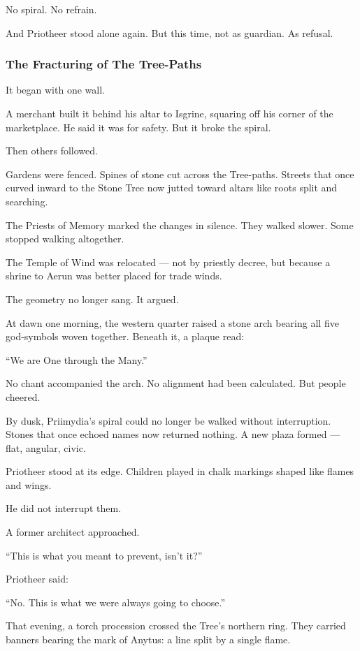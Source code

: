 \documentclass[12pt]{article}
\begin{document}
No spiral.  
No refrain.

And Priotheer stood alone again.  
But this time, not as guardian.  
As refusal.


\dotfill

\subsubsection*{The Fracturing of The Tree-Paths}

It began with one wall.

A merchant built it behind his altar to Isgrine,  
squaring off his corner of the marketplace.  
He said it was for safety.  
But it broke the spiral.

Then others followed.

Gardens were fenced.  
Spines of stone cut across the Tree-paths.  
Streets that once curved inward to the Stone Tree  
now jutted toward altars like roots split and searching.

The Priests of Memory marked the changes in silence.  
They walked slower.  
Some stopped walking altogether.

The Temple of Wind was relocated — not by priestly decree,  
but because a shrine to Aerun was better placed for trade winds.

The geometry no longer sang.  
It argued.

At dawn one morning, the western quarter raised a stone arch  
bearing all five god-symbols woven together.  
Beneath it, a plaque read:

 “We are One through the Many.”

No chant accompanied the arch.  
No alignment had been calculated.  
But people cheered.

By dusk, Priimydia’s spiral could no longer be walked without interruption.  
Stones that once echoed names now returned nothing.  
A new plaza formed — flat, angular, civic.

Priotheer stood at its edge.  
Children played in chalk markings shaped like flames and wings.

He did not interrupt them.

A former architect approached.

 “This is what you meant to prevent, isn’t it?”

Priotheer said:

 “No. This is what we were always going to choose.”

That evening, a torch procession crossed the Tree’s northern ring.  
They carried banners bearing the mark of Anytus:  
a line split by a single flame.
\end{document}
